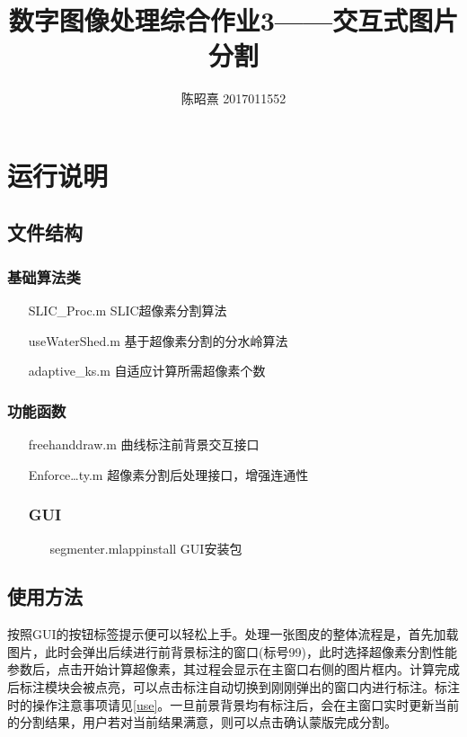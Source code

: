 \documentclass[UTF8]{ctexart}
\begin{document}
\title{数字图像处理综合作业3——交互式图片分割}
\author{陈昭熹 2017011552}
\maketitle
\tableofcontents
\newpage

\section{运行说明}
\subsection{文件结构}
\subsubsection{基础算法类}
\begin{itemize}
    \item[SLIC\_Proc.m] SLIC超像素分割算法
    \item[useWaterShed.m] 基于超像素分割的分水岭算法
    \item[adaptive\_ks.m] 自适应计算所需超像素个数
\end{itemize}
\subsubsection{功能函数}
\begin{itemize}
    \item[freehanddraw.m] 曲线标注前背景交互接口
    \item[Enforce\dots ty.m] 超像素分割后处理接口，增强连通性 
\subsubsection{GUI}
\begin{itemize}
    \item[segmenter.mlappinstall] GUI安装包         
\end{itemize}
\end{itemize}


\subsection{使用方法}

按照GUI的按钮标签提示便可以轻松上手。处理一张图皮的整体流程是，首先加载图片，此时会弹出后续进行前背景标注的窗口(标号99)，此时选择超像素分割性能参数后，点击开始计算超像素，其过程会显示在主窗口右侧的图片框内。计算完成后标注模块会被点亮，可以点击标注自动切换到刚刚弹出的窗口内进行标注。标注时的操作注意事项请见\ref{use}。一旦前景背景均有标注后，会在主窗口实时更新当前的分割结果，用户若对当前结果满意，则可以点击确认蒙版完成分割。
\end{document}
